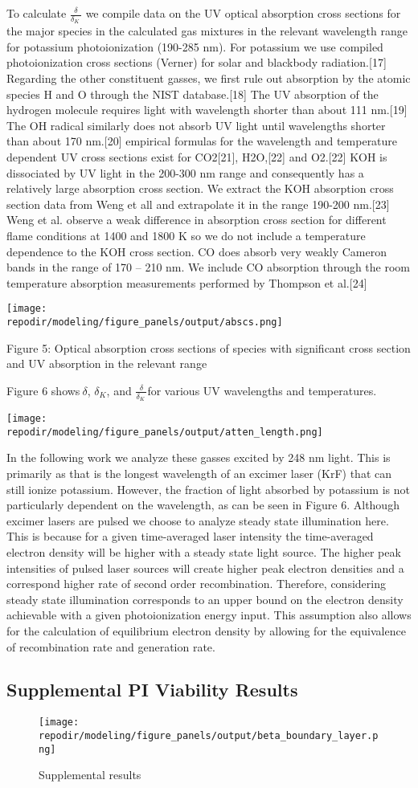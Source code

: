 To calculate \(\frac{\delta}{\delta_{K}\ }\) we compile data on the UV optical absorption cross sections for the major species in the calculated gas mixtures in the relevant wavelength range for potassium photoionization (190-285 nm). For potassium we use compiled photoionization cross sections (Verner) for solar and blackbody radiation.{[}17{]} Regarding the other constituent gasses, we first rule out absorption by the atomic species H and O through the NIST database.{[}18{]} The UV absorption of the hydrogen molecule requires light with wavelength shorter than about 111 nm.{[}19{]} The OH radical similarly does not absorb UV light until wavelengths shorter than about 170 nm.{[}20{]} empirical formulas for the wavelength and temperature dependent UV cross sections exist for CO2{[}21{]}, H2O,{[}22{]} and O2.{[}22{]} KOH is dissociated by UV light in the 200-300 nm range and consequently has a relatively large absorption cross section. We extract the KOH absorption cross section data from Weng et all and extrapolate it in the range 190-200 nm.{[}23{]} Weng et al. observe a weak difference in absorption cross section for different flame conditions at 1400 and 1800 K so we do not include a temperature dependence to the KOH cross section. CO does absorb very weakly Cameron bands in the range of 170 -- 210 nm. We include CO absorption through the room temperature absorption measurements performed by Thompson et al.{[}24{]}

\texttt{[image: \\repodir/modeling/figure\_panels/output/abscs.png]}

Figure 5: Optical absorption cross sections of species with significant cross section and UV absorption in the relevant range

Figure 6 shows\(\ \delta\), \(\delta_{K}\), and \(\frac{\delta}{\delta_{K}\ }\)for various UV wavelengths and temperatures.

\texttt{[image: \\repodir/modeling/figure\_panels/output/atten\_length.png]}


In the following work we analyze these gasses excited by 248 nm light. This is primarily as that is the longest wavelength of an excimer laser (KrF) that can still ionize potassium. However, the fraction of light absorbed by potassium is not particularly dependent on the wavelength, as can be seen in Figure 6. Although excimer lasers are pulsed we choose to analyze steady state illumination here. This is because for a given time-averaged laser intensity the time-averaged electron density will be higher with a steady state light source. The higher peak intensities of pulsed laser sources will create higher peak electron densities and a correspond higher rate of second order recombination. Therefore, considering steady state illumination corresponds to an upper bound on the electron density achievable with a given photoionization energy input. This assumption also allows for the calculation of equilibrium electron density by allowing for the equivalence of recombination rate and generation rate.

\clearpage

\subsection{Supplemental PI Viability Results}

\begin{figure}
\centering
\texttt{[image: \\repodir/modeling/figure\_panels/output/beta\_boundary\_layer.png]}
\caption{Supplemental results}
\end{figure}
